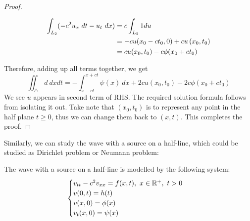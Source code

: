 \begin{proof}
\begin{itemize}
\begin{align*}
            \int_{L_2} (-c^2 u_x\ dt - u_t\ dx) &= c\int_{L_2} 1 du \\
            &= -cu(x_0-ct_0, 0) + cu\left(x_0, t_0\right)\\ 
            &= cu(x_0, t_0) -c\phi(x_0 + ct_0)
        \end{align*}
    \end{itemize}
    Therefore, adding up all terms together, we get 
    \[\iint_\triangle d\ dxdt = -\int_{x - ct}^{x + ct}\psi(x)\ dx + 2cu(x_0, t_0) -2c\phi(x_0 + ct_0)\]
    We see $u$ appears in second term of RHS. The required solution formula follows from isolating it out. Take note that $(x_0, t_0)$ is to represent any point in the half plane $t\geq 0$, thus we can change them back to $(x,t)$. This completes the proof.
\end{proof}

Similarly, we can study the wave with a source on a half-line, which could be studied as Dirichlet problem or Neumann problem:

\medskip 

\begin{defn} 
    The wave with a source on a half-line is modelled by the following system:
    \[\begin{cases}
        v_{tt} - c^2 v_{xx} = f(x,t),\ x\in {\mathbb R}^+,\ t>0\\
        v(0,t) = h(t)\\
        v(x,0) = \phi(x)\\
        v_t(x,0) = \psi(x)
    \end{cases}\]
\end{defn}

